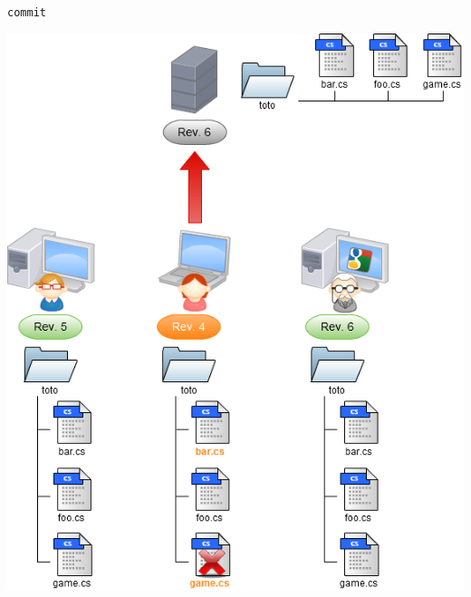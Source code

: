 \begin{frame}
  \texttt{commit}
  \begin{center}
    \vspace{-12pt}
    \includegraphics[scale=0.3]{images/8-Commit3.png}
  \end{center}
\end{frame}

